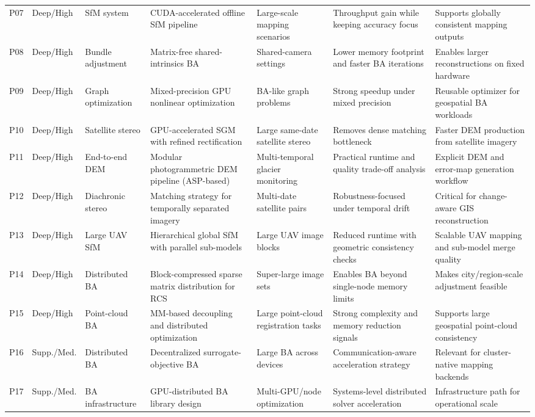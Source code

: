 \begin{table}[ht]
\begin{tabular}{p{}p{}p{}p{}p{}p{}p{}}
P07 & Deep/High & SfM system & CUDA-accelerated offline SfM pipeline & Large-scale mapping scenarios & Throughput gain while keeping accuracy focus & Supports globally consistent mapping outputs \\
P08 & Deep/High & Bundle adjustment & Matrix-free shared-intrinsics BA & Shared-camera settings & Lower memory footprint and faster BA iterations & Enables larger reconstructions on fixed hardware \\
P09 & Deep/High & Graph optimization & Mixed-precision GPU nonlinear optimization & BA-like graph problems & Strong speedup under mixed precision & Reusable optimizer for geospatial BA workloads \\
P10 & Deep/High & Satellite stereo & GPU-accelerated SGM with refined rectification & Large same-date satellite stereo & Removes dense matching bottleneck & Faster DEM production from satellite imagery \\
P11 & Deep/High & End-to-end DEM & Modular photogrammetric DEM pipeline (ASP-based) & Multi-temporal glacier monitoring & Practical runtime and quality trade-off analysis & Explicit DEM and error-map generation workflow \\
P12 & Deep/High & Diachronic stereo & Matching strategy for temporally separated imagery & Multi-date satellite pairs & Robustness-focused under temporal drift & Critical for change-aware GIS reconstruction \\
P13 & Deep/High & Large UAV SfM & Hierarchical global SfM with parallel sub-models & Large UAV image blocks & Reduced runtime with geometric consistency checks & Scalable UAV mapping and sub-model merge quality \\
P14 & Deep/High & Distributed BA & Block-compressed sparse matrix distribution for RCS & Super-large image sets & Enables BA beyond single-node memory limits & Makes city/region-scale adjustment feasible \\
P15 & Deep/High & Point-cloud BA & MM-based decoupling and distributed optimization & Large point-cloud registration tasks & Strong complexity and memory reduction signals & Supports large geospatial point-cloud consistency \\
P16 & Supp./Med. & Distributed BA & Decentralized surrogate-objective BA & Large BA across devices & Communication-aware acceleration strategy & Relevant for cluster-native mapping backends \\
P17 & Supp./Med. & BA infrastructure & GPU-distributed BA library design & Multi-GPU/node optimization & Systems-level distributed solver acceleration & Infrastructure path for operational scale \\

\end{tabular}
\end{table}
